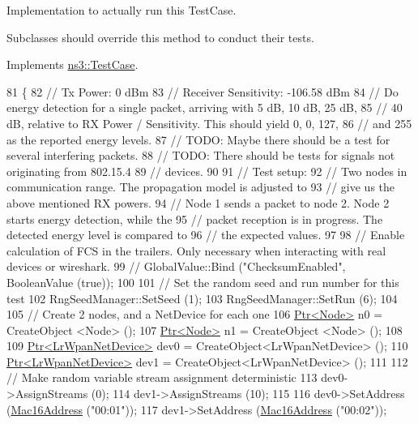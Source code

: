 Implementation to actually run this Test\+Case. 

Subclasses should override this method to conduct their tests. 

Implements \hyperlink{classns3_1_1TestCase_a8ff74680cf017ed42011e4be51917a24}{ns3\+::\+Test\+Case}.


\begin{DoxyCode}
81 \{
82   \textcolor{comment}{// Tx Power: 0 dBm}
83   \textcolor{comment}{// Receiver Sensitivity: -106.58 dBm}
84   \textcolor{comment}{// Do energy detection for a single packet, arriving with 5 dB, 10 dB, 25 dB,}
85   \textcolor{comment}{// 40 dB, relative to RX Power / Sensitivity. This should yield 0, 0, 127,}
86   \textcolor{comment}{// and 255 as the reported energy levels.}
87   \textcolor{comment}{// TODO: Maybe there should be a test for several interfering packets.}
88   \textcolor{comment}{// TODO: There should be tests for signals not originating from 802.15.4}
89   \textcolor{comment}{//       devices.}
90 
91   \textcolor{comment}{// Test setup:}
92   \textcolor{comment}{// Two nodes in communication range. The propagation model is adjusted to}
93   \textcolor{comment}{// give us the above mentioned RX powers.}
94   \textcolor{comment}{// Node 1 sends a packet to node 2. Node 2 starts energy detection, while the}
95   \textcolor{comment}{// packet reception is in progress. The detected energy level is compared to}
96   \textcolor{comment}{// the expected values.}
97 
98   \textcolor{comment}{// Enable calculation of FCS in the trailers. Only necessary when interacting with real devices or
       wireshark.}
99   \textcolor{comment}{// GlobalValue::Bind ("ChecksumEnabled", BooleanValue (true));}
100 
101   \textcolor{comment}{// Set the random seed and run number for this test}
102   RngSeedManager::SetSeed (1);
103   RngSeedManager::SetRun (6);
104 
105   \textcolor{comment}{// Create 2 nodes, and a NetDevice for each one}
106   \hyperlink{classns3_1_1Ptr}{Ptr<Node>} n0 = CreateObject <Node> ();
107   \hyperlink{classns3_1_1Ptr}{Ptr<Node>} n1 = CreateObject <Node> ();
108 
109   \hyperlink{classns3_1_1Ptr}{Ptr<LrWpanNetDevice>} dev0 = CreateObject<LrWpanNetDevice> ();
110   \hyperlink{classns3_1_1Ptr}{Ptr<LrWpanNetDevice>} dev1 = CreateObject<LrWpanNetDevice> ();
111 
112   \textcolor{comment}{// Make random variable stream assignment deterministic}
113   dev0->AssignStreams (0);
114   dev1->AssignStreams (10);
115 
116   dev0->SetAddress (\hyperlink{classns3_1_1Mac16Address}{Mac16Address} (\textcolor{stringliteral}{"00:01"}));
117   dev1->SetAddress (\hyperlink{classns3_1_1Mac16Address}{Mac16Address} (\textcolor{stringliteral}{"00:02"}));

\end{DoxyCode}
